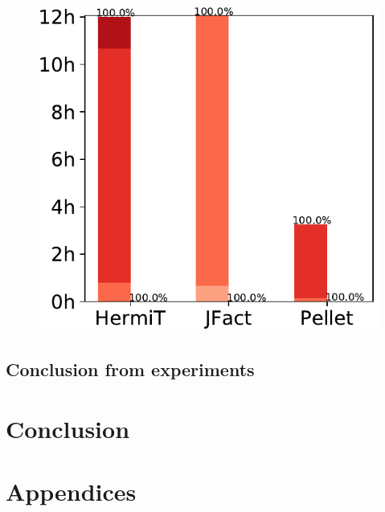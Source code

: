 \documentclass[12pt,a4paper]{article}
\begin{document}
\begin{figure}[H]
	\includegraphics[width=\textwidth]{eval2LUBM} 
\end{figure}

\subsection{Conclusion from experiments}


\pagebreak
\section*{Conclusion}

\pagebreak
{}



\pagebreak
\section*{Appendices}
\end{document}

